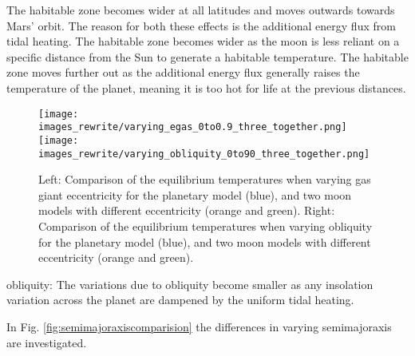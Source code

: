 \documentclass[12pt, onecolumn]{revtex4-2}    %
\begin{document}
The habitable zone becomes wider at all latitudes and moves outwards towards Mars' orbit.
The reason for both these effects is the additional energy flux from tidal heating.
The habitable zone becomes wider as the moon is less reliant on a specific distance from the Sun to generate a habitable temperature.
The habitable zone moves further out as the additional energy flux generally raises the temperature of the planet, meaning it is too hot for life at the previous distances.



\begin{figure}
  \texttt{[image: images\_rewrite/varying\_egas\_0to0.9\_three\_together.png]}
  \texttt{[image: images\_rewrite/varying\_obliquity\_0to90\_three\_together.png]}
  \caption{
    Left: Comparison of the equilibrium temperatures when varying gas giant eccentricity for the planetary model (blue), and two moon models with different eccentricity (orange and green).
    Right: Comparison of the equilibrium temperatures when varying obliquity for the planetary model (blue), and two moon models with different eccentricity (orange and green).
  }
  \label{fig:qualitative_tidalheating_eccentrcity}
\end{figure}

obliquity:
The variations due to obliquity become smaller as any insolation variation across the planet are dampened by the uniform tidal heating.


In Fig. \ref{fig:semimajoraxiscomparision} the differences in varying semimajoraxis are investigated.
\end{document}
